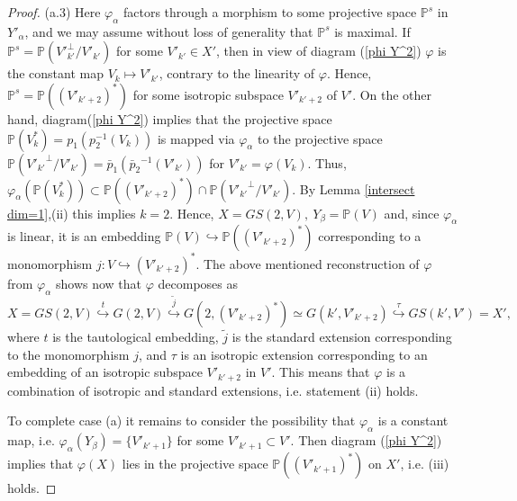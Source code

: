 \documentclass[12pt]{amsart}
\renewcommand{\phi}{\varphi}
\theoremstyle{definition}
\begin{document}
\begin{proof}
(a.3) Here $\phi_{\alpha}$ factors through a morphism to some projective space $\mathbb{P}^s$ in $Y'_{\alpha}$,
and we may assume without loss of generality that $\mathbb{P}^s$ is maximal. If $\mathbb{P}^s=
\mathbb{P}({V'}_{k'}^\bot/V'_{k'})$ for some $V'_{k'}\in X'$, then in view of diagram (\ref{phi Y^2}) $\phi$ is the
constant map $V_k\mapsto V'_{k'}$, contrary to the linearity of $\phi$. Hence, $\mathbb{P}^s=
\mathbb{P}((V'_{k'+2})^*)$ for some isotropic subspace $V'_{k'+2}$ of $V'$. On the other hand,
diagram(\ref{phi Y^2}) implies that the projective space
$\mathbb{P}(V_k^*)=p_1(p_2^{-1}(V_k))$ is mapped via $\phi_{\alpha}$ to the projective space
$\mathbb{P}({V'_{k'}}^\bot/V'_{k'})=\bar{p}_1({\bar{p}_2}^{-1}(V'_{k'}))$ for $V'_{k'}=\phi(V_k)$. Thus,
$\phi_{\alpha}(\mathbb{P}(V_k^*))\subset\mathbb{P}((V'_{k'+2})^*)\cap\mathbb{P}({V'_{k'}}^\bot/V'_{k'})$. By Lemma
\ref{intersect dim=1},(ii) this implies $k=2$.  Hence, $X=GS(2,V),\ Y_{\beta}=\mathbb{P}(V)$ and, since $\phi_{\alpha}$
is linear, it is an embedding $\mathbb{P}(V)\hookrightarrow \mathbb{P}((V'_{k'+2})^*)$ corresponding to
a monomorphism $j:V\hookrightarrow(V'_{k'+2})^*$. The above mentioned reconstruction of $\phi$ from $\phi_{\alpha}$
shows now that $\phi$ decomposes as
$$
X=GS(2,V)\overset{t}\hookrightarrow G(2,V)\overset{\tilde{j}}\hookrightarrow
G(2,(V'_{k'+2})^*)\simeq G(k',V'_{k'+2})\overset{\tau}\hookrightarrow GS(k',V')=X',
$$
where $t$ is the tautological
embedding, $\tilde{j}$ is the standard extension corresponding to the monomorphism $j$, and $\tau$ is an isotropic
extension corresponding to an embedding of an isotropic subspace $V'_{k'+2}$ in $V'$. This means that $\phi$ is
a combination of isotropic and standard extensions, i.e. statement (ii) holds.

To complete case (a) it remains to consider the possibility that $\phi_{\alpha}$ is a constant map,
i.e. $\phi_{\alpha}(Y_{\beta})=\{V'_{k'+1}\}$ for some $V'_{k'+1}\subset V'$. Then diagram (\ref{phi Y^2})
implies that $\phi(X)$ lies in the projective space $\mathbb{P}(({V'}_{k'+1})^*)$ on $X'$, i.e. (iii) holds.



\end{proof}
\end{document}

